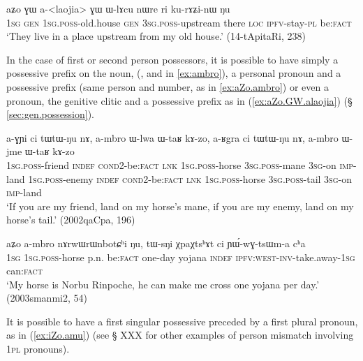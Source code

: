 \begin{exe}
\ex \label{ex:aZo.GW.alaojia}
\gll
aʑo ɣɯ a-<laojia> ɣɯ ɯ-lɤcu nɯre ri ku-rɤʑi-nɯ ŋu \\
\textsc{1sg} \textsc{gen} \textsc{1sg.poss}-old.house \textsc{gen} \textsc{3sg.poss}-upstream there \textsc{loc} \textsc{ipfv}-stay-\textsc{pl} be:\textsc{fact} \\
\glt `They live in a place upstream from my old house.' (14-tApitaRi, 238)
\end{exe}

In the case of first or second person possessors, it is possible to have simply a possessive prefix on the noun, (,  and  in \ref{ex:ambro}), a personal pronoun and a possessive prefix (same person and number, as in \ref{ex:aZo.ambro}) or even a pronoun, the genitive clitic  and a possessive prefix as in (\ref{ex:aZo.GW.alaojia}) (§ \ref{sec:gen.possession}).

 \begin{exe}
\ex \label{ex:ambro} 
\gll a-ɣɲi ci tɯ\redp{}tɯ-ŋu nɤ, a-mbro ɯ-lwa ɯ-taʁ kɤ-zo, a-ʁgra ci tɯ\redp{}tɯ-ŋu nɤ, a-mbro ɯ-jme ɯ-taʁ kɤ-zo \\
\textsc{1sg.poss}-friend \textsc{indef} \textsc{cond}\redp{}2-be:\textsc{fact} \textsc{lnk} \textsc{1sg.poss}-horse \textsc{3sg.poss}-mane \textsc{3sg}-on \textsc{imp}-land \textsc{1sg.poss}-enemy \textsc{indef} \textsc{cond}\redp{}2-be:\textsc{fact} \textsc{lnk} \textsc{1sg.poss}-horse \textsc{3sg.poss}-tail  \textsc{3sg}-on \textsc{imp}-land  \\
\glt `If you are my friend, land on my horse's mane, if you are my enemy, land on my horse's tail.' (2002qaCpa, 196)
\end{exe}

\begin{exe}
\ex \label{ex:aZo.ambro}
\gll aʑo a-mbro nɤrwɯrɯnbotɕʰi ŋu, tɯ-sŋi χpaχtsʰɤt ci ɲɯ́-wɣ-tsɯm-a cʰa \\
\textsc{1sg} \textsc{1sg.poss}-horse p.n. be:\textsc{fact} one-day yojana \textsc{indef} \textsc{ipfv:west}-\textsc{inv}-take.away-\textsc{1sg} can:\textsc{fact} \\
\glt `My horse is Norbu Rinpoche, he can make me cross one yojana per day.' (2003smanmi2, 54)
\end{exe}

It is possible to have a first singular possessive preceded by a first plural pronoun, as in (\ref{ex:iZo.amu}) (see § XXX for other examples of person mismatch involving \textsc{1pl} pronouns).

